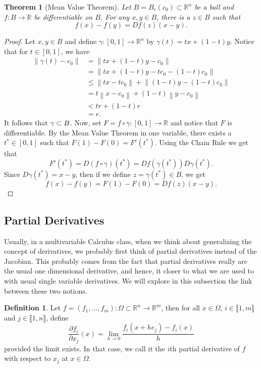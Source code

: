 \documentclass{article}
\theoremstyle{plain}
\newtheorem{theorem}{Theorem}[subsection]
\theoremstyle{definition}
\newtheorem*{definition}{Definition}
\newcommand{\R}{\mathbb{R}}
\newcommand{\Iint}[2]{\llbracket #1 , #2 \rrbracket}
\let\Im\relax
\DeclareMathOperator{\Im}{Im}
\newcommand{\norm}[1]{\left\lVert#1 \right\rVert}
\begin{document}
\begin{theorem}[Mean Value Theorem]
    Let $B = B_{r}(c_0) \subset \R^n$ be a ball and $f : B \to \R$ be differentiable on $B$. For any $x,y \in B$, there is a $z \in B$ such that
    $$f(x) - f(y) = Df(z)(x - y).$$
\end{theorem}

\begin{proof}
    Let $x,y \in B$ and define $\gamma : [0,1] \to \R^n$ by $\gamma(t) = tx + (1 - t)y$. Notice that for $t \in [0,1]$, we have
    \begin{align*}
        \norm{\gamma(t) - c_0} &= \norm{tx + (1 - t)y - c_0} \\
        &= \norm{tx + (1 - t)y - tc_0 -(1 - t)c_0} \\
        &\leq \norm{tx - tc_0} + \norm{(1 - t)y - (1-t)c_0} \\
        &= t\norm{x - c_0} + (1 - t)\norm{y - c_0} \\
        &< tr + (1 - t)r \\
        &= r.
    \end{align*}
    It follows that $\Im \gamma \subset B$. Now, set $F = f \circ \gamma : [0,1] \to \R$ and notice that $F$ is differentiable. By the Mean Value Theorem in one variable, there exists a $t^* \in [0,1]$ such that $F(1) - F(0) = F'(t^*)$. Using the Chain Rule we get that
    $$F'(t^*) = D(f \circ \gamma)(t^*) = Df(\gamma(t^*))D\gamma(t^*).$$
    Since $D\gamma(t^*) = x - y$, then if we define $z = \gamma(t^*) \in B$, we get
    $$f(x) - f(y) = F(1) - F(0) = Df(z)(x - y).$$
\end{proof}

\subsection{Partial Derivatives}

Usually, in a multivariable Calculus class, when we think about generalizing the concept of derivatives, we probably first think of partial derivatives instead of the Jacobian. This probably comes from the fact that partial derivatives really are the usual one dimensional derivative, and hence, it closer to what we are used to with usual single variable derivatives. We will explore in this subsection the link between these two notions.

\begin{definition}
    Let $f = (f_1, ..., f_m): \Omega \subset \R^n \to \R^m$, then for all $x \in \Omega$, $i \in \Iint{1}{m}$ and $j \in \Iint{1}{n}$, define
    $$\frac{\partial f_i}{\partial x_j}(x) = \lim_{h \rightarrow 0}\frac{f_i(x + he_j) - f_i(x)}{h}$$
    provided the limit exists. In that case, we call it the $i$th partial derivative of $f$ with respect to $x_j$ at $x \in \Omega$.
\end{definition}
\end{document}
